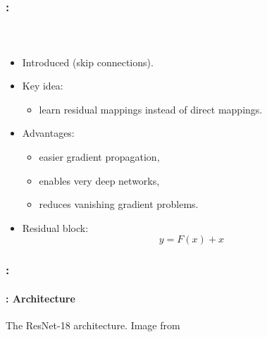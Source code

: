 \documentclass[xcolor=table]{beamer}
\begin{document}
\begin{frame}
	\frametitle{\insertshortsubtitle: \insertsection}
	\framesubtitle{\insertsubsection\ \cite{2016-he-al}}
	
	\begin{itemize}
		
		\item Introduced  (skip connections).
		
		\item Key idea:
		\begin{itemize}
			\item learn residual mappings instead of direct mappings.
		\end{itemize}
		
		\item Advantages:
		\begin{itemize}
			\item easier gradient propagation,
			\item enables very deep networks,
			\item reduces vanishing gradient problems.
		\end{itemize}
		
		\item Residual block:
		\[
		y = F(x) + x
		\]
		
	\end{itemize}
	
\end{frame}

\begin{frame}
	\frametitle{\insertshortsubtitle: \insertsection}
	\framesubtitle{\insertsubsection: Architecture}
	
	\begin{center}
		
		The ResNet-18 architecture. Image from \cite{d2l}
	\end{center}
	
\end{frame}

\end{document}
